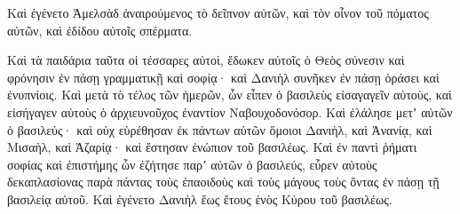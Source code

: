 {Καὶ ἐγένετο Ἀμελσὰδ ἀναιρούμενος τὸ δεῖπνον αὐτῶν, καὶ τὸν οἶνον τοῦ πόματος αὐτῶν, καὶ ἐδίδου αὐτοῖς σπέρματα.
\par }{\PP {}Καὶ τὰ παιδάρια ταῦτα οἱ τέσσαρες αὐτοὶ, ἔδωκεν αὐτοῖς ὁ Θεὸς σύνεσιν καὶ φρόνησιν ἐν πάσῃ γραμματικῇ καὶ σοφίᾳ· καὶ Δανιὴλ συνῆκεν ἐν πάσῃ ὁράσει καὶ ἐνυπνίοις.
Καὶ μετὰ τὸ τέλος τῶν ἡμερῶν, ὧν εἶπεν ὁ βασιλεὺς εἰσαγαγεῖν αὐτοὺς, καὶ εἰσήγαγεν αὐτοὺς ὁ ἀρχιευνοῦχος ἐναντίον Ναβουχοδονόσορ.
Καὶ ἐλάλησε μετʼ αὐτῶν ὁ βασιλεύς· καὶ οὐχ εὑρέθησαν ἐκ πάντων αὐτῶν ὅμοιοι Δανιὴλ, καὶ Ἀνανίᾳ, καὶ Μισαὴλ, καὶ Ἀζαρίᾳ· καὶ ἔστησαν ἐνώπιον τοῦ βασιλέως.
Καὶ ἐν παντὶ ῥήματι σοφίας καὶ ἐπιστήμης ὧν ἐζήτησε παρʼ αὐτῶν ὁ βασιλεύς, εὗρεν αὐτοὺς δεκαπλασίονας παρὰ πάντας τοὺς ἐπαοιδοὺς καὶ τοὺς μάγους τοὺς ὄντας ἐν πάσῃ τῇ βασιλείᾳ αὐτοῦ.
Καὶ ἐγένετο Δανιὴλ ἕως ἔτους ἑνὸς Κύρου τοῦ βασιλέως.

}
